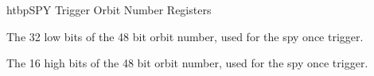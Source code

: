 \begin{register}{htbp}{SPY Trigger Orbit Number Registers}{}%
	\label{spy_trig_obrit_nr_reg}
	\begin{regdesc}
	\begin{reglist}
		\item [orbit\_nr\_low] The 32 low bits of the 48 bit orbit number, used for the spy once trigger.
		\item [orbit\_nr\_high] The 16 high bits of the 48 bit orbit number, used for the spy once trigger.
	\end{reglist}
	\end{regdesc}
\end{register}

